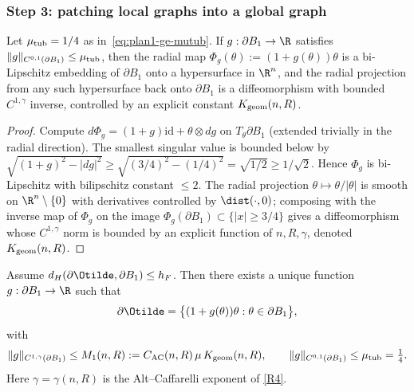 \subsubsection{Step 3: patching local graphs into a global graph}
\label{subsubsec:plan1-ge-S3}

\begin{lemma}\label{lem:plan1-ge-tubular}
Let \(\mu_{\rm tub}=1/4\) as in~\eqref{eq:plan1-ge-mutub}. If
\(g:\partial B_1\to\R\) satisfies
\(\|g\|_{C^{0,1}(\partial B_1)}\le\mu_{\rm tub}\), then the radial map
\(\Phi_g(\theta):=(1+g(\theta))\theta\) is a bi-Lipschitz embedding of
\(\partial B_1\) onto a hypersurface in \(\R^n\), and the radial
projection from any such hypersurface back onto \(\partial B_1\) is a
diffeomorphism with bounded \(C^{1,\gamma}\) inverse, controlled by an
explicit constant \(K_{\rm geom}(n,R)\).
\end{lemma}

\begin{proof}
Compute \(d\Phi_g=(1+g)\mathrm{id}+\theta\otimes dg\) on \(T_\theta\partial B_1\)
(extended trivially in the radial direction). The smallest singular value
is bounded below by \(\sqrt{(1+g)^2-|dg|^2}\ge\sqrt{(3/4)^2-(1/4)^2}
=\sqrt{1/2}\ge 1/\sqrt2\). Hence \(\Phi_g\) is bi-Lipschitz with bilipschitz
constant \(\le 2\). The radial projection \(\theta\mapsto\theta/|\theta|\)
is smooth on \(\R^n\setminus\{0\}\) with derivatives controlled by
\(\dist(\cdot,0)\); composing with the inverse map of \(\Phi_g\) on the
image \(\Phi_g(\partial B_1)\subset\{|x|\ge 3/4\}\) gives a
diffeomorphism whose \(C^{1,\gamma}\) norm is bounded by an explicit
function of \(n,R,\gamma\), denoted \(K_{\rm geom}(n,R)\).
\end{proof}

\begin{proposition}
\label{prop:plan1-ge-patching}
Assume \(d_H(\partial\Otilde,\partial B_1)\le h_F\). Then there exists a
unique function \(g:\partial B_1\to\R\) such that
\begin{equation}\label{eq:plan1-ge-graph}
   \partial\Otilde=\bigl\{(1+g(\theta))\theta:\theta\in\partial B_1\bigr\},
\end{equation}
with
\begin{equation}\label{eq:plan1-ge-norm-graph}
   \|g\|_{C^{1,\gamma}(\partial B_1)}\le M_1(n,R)
   :=C_{\rm AC}(n,R)\,\mu\,K_{\rm geom}(n,R),\qquad
   \|g\|_{C^{0,1}(\partial B_1)}\le\mu_{\rm tub}=\tfrac14.
\end{equation}
Here \(\gamma=\gamma(n,R)\) is the Alt--Caffarelli exponent of
\ref{R4}.
\end{proposition}

